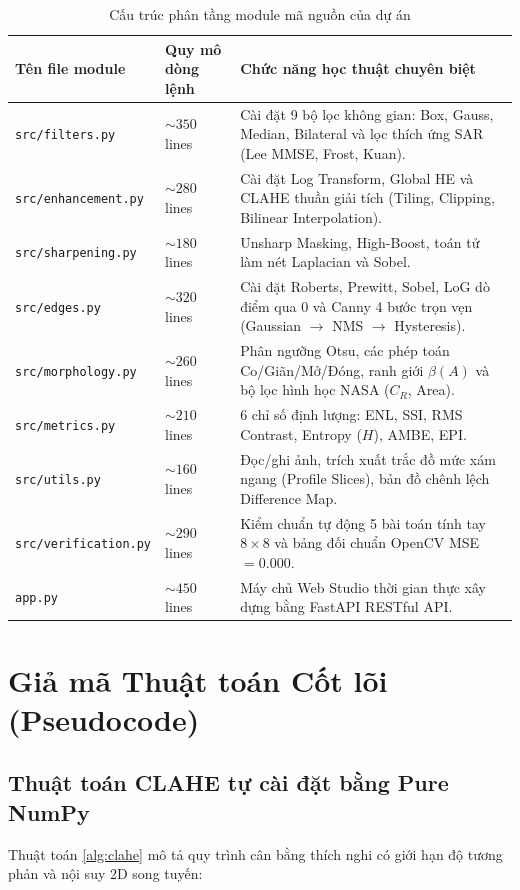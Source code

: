 \begin{table}[H]
\centering
\small
\begin{tabularx}{\textwidth}{|l|l|X|}
\hline
\textbf{Tên file module} & \textbf{Quy mô dòng lệnh} & \textbf{Chức năng học thuật chuyên biệt} \\
\hline
\texttt{src/filters.py} & $\sim 350$ lines & Cài đặt 9 bộ lọc không gian: Box, Gauss, Median, Bilateral và lọc thích ứng SAR (Lee MMSE, Frost, Kuan). \\
\hline
\texttt{src/enhancement.py} & $\sim 280$ lines & Cài đặt Log Transform, Global HE và CLAHE thuần giải tích (Tiling, Clipping, Bilinear Interpolation). \\
\hline
\texttt{src/sharpening.py} & $\sim 180$ lines & Unsharp Masking, High-Boost, toán tử làm nét Laplacian và Sobel. \\
\hline
\texttt{src/edges.py} & $\sim 320$ lines & Cài đặt Roberts, Prewitt, Sobel, LoG dò điểm qua 0 và Canny 4 bước trọn vẹn (Gaussian $\to$ NMS $\to$ Hysteresis). \\
\hline
\texttt{src/morphology.py} & $\sim 260$ lines & Phân ngưỡng Otsu, các phép toán Co/Giãn/Mở/Đóng, ranh giới $\beta(A)$ và bộ lọc hình học NASA ($C_R$, Area). \\
\hline
\texttt{src/metrics.py} & $\sim 210$ lines & 6 chỉ số định lượng: ENL, SSI, RMS Contrast, Entropy ($H$), AMBE, EPI. \\
\hline
\texttt{src/utils.py} & $\sim 160$ lines & Đọc/ghi ảnh, trích xuất trắc đồ mức xám ngang (Profile Slices), bản đồ chênh lệch Difference Map. \\
\hline
\texttt{src/verification.py} & $\sim 290$ lines & Kiểm chuẩn tự động 5 bài toán tính tay $8 \times 8$ và bảng đối chuẩn OpenCV MSE $= 0.000$. \\
\hline
\texttt{app.py} & $\sim 450$ lines & Máy chủ Web Studio thời gian thực xây dựng bằng FastAPI RESTful API. \\
\hline
\end{tabularx}
\caption{Cấu trúc phân tầng module mã nguồn của dự án}
\label{tab:code_structure}
\end{table}



\section{Giả mã Thuật toán Cốt lõi (Pseudocode)}

\subsection{Thuật toán CLAHE tự cài đặt bằng Pure NumPy}
Thuật toán \ref{alg:clahe} mô tả quy trình cân bằng thích nghi có giới hạn độ tương phản và nội suy 2D song tuyến:

